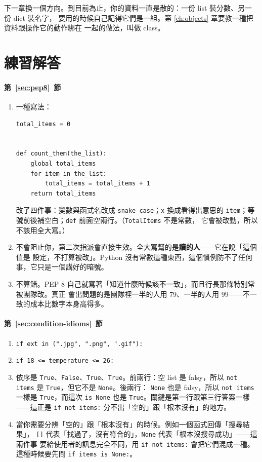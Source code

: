 下一章換一個方向。到目前為止，你的資料一直是散的：一份 list 裝分數、另一份 dict 裝名字，
要用的時候自己記得它們是一組。第 \ref{ch:objects} 章要教一種把資料跟操作它的動作綁在
一起的做法，叫做 class。

\section*{練習解答}

\paragraph{第~\ref{sec:pep8}~節}
\begin{enumerate}
\item 一種寫法：
\begin{verbatim}
total_items = 0


def count_them(the_list):
    global total_items
    for item in the_list:
        total_items = total_items + 1
    return total_items
\end{verbatim}
改了四件事：變數與函式名改成 \texttt{snake\_case}；\texttt{x} 換成看得出意思的
\texttt{item}；等號前後補空白；\texttt{def} 前面空兩行。（\texttt{TotalItems} 不是常數，
它會被改動，所以不該用全大寫。）
\item 不會阻止你，第二次指派會直接生效。全大寫幫的是\textbf{讀的人}——它在說「這個值是
設定，不打算被改」。Python 沒有常數這種東西，這個慣例防不了任何事，它只是一個講好的暗號。
\item 不算錯。PEP 8 自己就寫著「知道什麼時候該不一致」，而且行長那條特別常被團隊改。真正
會出問題的是團隊裡一半的人用 79、一半的人用 99——不一致的成本比數字本身高得多。
\end{enumerate}

\paragraph{第~\ref{sec:condition-idioms}~節}
\begin{enumerate}
\item \texttt{if ext in (".jpg", ".png", ".gif"):}
\item \texttt{if 18 <= temperature <= 26:}
\item 依序是 \texttt{True}、\texttt{False}、\texttt{True}、\texttt{True}。前兩行：空 list
是 falsy，所以 \texttt{not items} 是 \texttt{True}，但它不是 \texttt{None}。後兩行：
\texttt{None} 也是 falsy，所以 \texttt{not items} 一樣是 \texttt{True}，而這次
\texttt{is None} 也是 \texttt{True}。關鍵是第一行跟第三行答案一樣——這正是
\texttt{if not items:} 分不出「空的」跟「根本沒有」的地方。
\item 當你需要分辨「空的」跟「根本沒有」的時候。例如一個函式回傳「搜尋結果」，
\texttt{[]} 代表「找過了，沒有符合的」，\texttt{None} 代表「根本沒搜尋成功」——這兩件事
要給使用者的訊息完全不同，用 \texttt{if not items:} 會把它們混成一種。這種時候要先問
\texttt{if items is None:}。
\end{enumerate}

